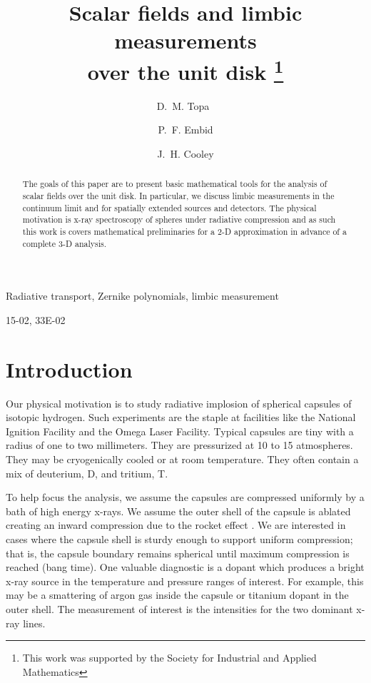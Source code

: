 \documentclass[final,leqno,onefignum,onetabnum]{siamltex1213}
\title{Scalar fields and limbic measurements\\ over the unit disk \thanks{This work was
supported by the Society for Industrial and Applied Mathematics}}
\author{D.~M. Topa\footnotemark[1]\ \footnotemark[2] \and P.~F. Embid\footnotemark[1] \and J.~H. Cooley\footnotemark[1]}
\begin{document}
\maketitle
{}%

\begin{abstract}
The goals of this paper are to present basic mathematical tools for the analysis of scalar fields over the unit disk. In particular, we discuss limbic measurements in the continuum limit and for spatially extended sources and detectors. The physical motivation is x-ray spectroscopy of spheres under radiative compression and as such this work is covers mathematical preliminaries for a 2-D approximation in advance of a complete 3-D analysis.
\end{abstract}

\begin{keywords}
 Radiative transport, Zernike polynomials, limbic measurement
\end{keywords}

\begin{AMS}
15-02, 33E-02
\end{AMS}


\pagestyle{myheadings}
\thispagestyle{plain}

\section{Introduction}

Our physical motivation is to study radiative implosion of spherical capsules of isotopic hydrogen. Such experiments are the staple at facilities like the National Ignition Facility and the Omega Laser Facility. Typical capsules are tiny with a radius of one to two millimeters. They are pressurized at 10 to 15 atmospheres. They may be cryogenically cooled or at room temperature. They often contain a mix of deuterium, D, and tritium, T.

To help focus the analysis, we assume the capsules are compressed uniformly by a bath of high energy x-rays. We assume the outer shell of the capsule is ablated creating an inward compression due to the rocket effect \cite{Lindle}. We are interested in cases where the capsule shell is sturdy enough to support uniform compression; that is, the capsule boundary remains spherical until maximum compression is reached (bang time). One valuable diagnostic is a dopant which produces a bright x-ray source in the temperature and pressure ranges of interest. For example, this may be a smattering of argon gas inside the capsule or titanium dopant in the outer shell. The measurement of interest is the intensities for the two dominant x-ray lines. 
\end{document}
